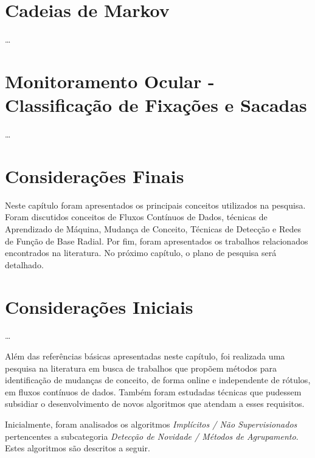 \documentclass[msc, classic, a4paper]{ufbathesis}
\begin{document}
\section{Cadeias de Markov}

\ldots

\section{Monitoramento Ocular - Classificação de Fixações e Sacadas}

\ldots

\section{Considerações Finais}

Neste capítulo foram apresentados os principais conceitos utilizados na pesquisa.
Foram discutidos conceitos de Fluxos Contínuos de Dados,
técnicas de Aprendizado de Máquina,
Mudança de Conceito,
Técnicas de Detecção e Redes de Função de Base Radial.
Por fim, foram apresentados os trabalhos relacionados encontrados na literatura.
No próximo capítulo, o plano de pesquisa será detalhado.

 \label{trabalhos_relacionados}

\section{Considerações Iniciais}

\ldots

Além das referências básicas apresentadas neste capítulo, foi realizada uma pesquisa na literatura em busca de trabalhos que propõem métodos para identificação de mudanças de conceito, de forma online e independente de rótulos, em fluxos contínuos de dados. Também foram estudadas técnicas que pudessem subsidiar o desenvolvimento de novos algoritmos que atendam a esses requisitos.

Inicialmente, foram analisados os algoritmos \textit{Implícitos / Não Supervisionados} pertencentes a subcategoria \textit{Detecção de Novidade / Métodos de Agrupamento}. Estes algoritmos são descritos a seguir.

\end{document}
